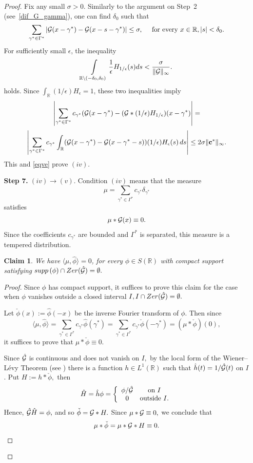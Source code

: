 \documentclass[12pt]{amsart}
\numberwithin{equation}{section}
\newtheorem{claim}[theorem]{Claim}
\newcommand{\R}{{\mathbb R}} \newcommand{\Q}{{\mathbb Q}} \newcommand{\Z}{{\mathbb Z}} \newcommand{\N}{{\mathbb N}}
\newcommand{\Zer}{{\rm Zer}}
\newcommand{\supp}{{\rm supp\,}}
\begin{document}
\begin{proof}
 
    Fix any small $\sigma > 0.$
    Similarly to the argument on Step~2 (see~\eqref{dif_G_gamma}), one can find $\delta_0$ such that 
  $$  \sum_{\gamma^\ast\in \Gamma^\ast}|\Ff(x-\gamma^\ast) - \Ff(x-s-\gamma^{\ast})| \le \sigma, \quad  \text{   for every } x\in \R, |s| < \delta_0. 
  $$
    For sufficiently small $\epsilon$, the inequality
    $$\int\limits_{\R\setminus(-\delta_0,\delta_0)} \frac{1}{\epsilon}  H_{1/\epsilon}(s) ds < \frac{\sigma}{\|\Ff\|_\infty}.
    $$
    holds. Since $\int_\R (1/\epsilon)H_\epsilon=1$, these two inequalities imply
        $$\left|\sum_{\gamma^\ast\in \Gamma^\ast}c_{\gamma^\ast}(\mathcal{G}(x-\gamma^\ast) - (\mathcal{G}\ast (1/\epsilon) H_{1/\epsilon})(x-\gamma^\ast)\right|=$$    
     $$\left|\sum_{\gamma^\ast\in \Gamma^\ast}c_{\gamma^\ast}\int_\R(\Ff(x-\gamma^\ast) - \Ff(x-\gamma^\ast-s)) (1/\epsilon)H_\epsilon(s)\,ds\right| \le2\sigma\|{\bf c^\ast}\|_\infty.$$This and \eqref{eqve} prove $(iv)$. 



{ \bf   \noindent Step 7.} $(iv)\rightarrow (v)$. Condition $(iv)$ means that the measure $$\mu=\sum_{\gamma^\ast\in\Gamma^\ast}c_{\gamma^\ast}\delta_{\gamma^\ast}$$satisfies
    $$\mu\ast \mathcal{G}(x)\equiv 0.$$
    Since the coefficients $c_{\gamma^{\ast}}$ are bounded and 
   $\Gamma^{\ast}$ is separated, this measure is a tempered distribution. 

    \begin{claim}\label{c1}
        We have $\langle\mu,\hat\phi\rangle=0$, for every $\phi\in S(\R)$ with compact support satisfying $\supp(\phi)\cap \Zer(\hat\Ff)=\emptyset.$
    \end{claim}


\begin{proof}
    Since $\phi$ has compact support, it suffices to prove this claim for the case when
    $\phi$ vanishes outside a closed interval $I, I\cap \Zer(\hat\Ff)=\emptyset.$

    Let $\check\phi(x):=\hat\phi(-x)$ be  the inverse Fourier transform of $\phi$. 
    Then since$$\langle \mu,\hat\phi \rangle =\sum_{\gamma^\ast\in\Gamma^\ast}c_{\gamma^\ast}\hat\phi(\gamma^\ast)=\sum_{\gamma^\ast\in\Gamma^\ast}c_{\gamma^\ast} \check\phi(-\gamma^\ast)=(\mu\ast \check\phi)(0),$$it suffices to prove that $\mu\ast\check\phi\equiv0.$


    Since $\hat{\mathcal{G}}$ is continuous and does not vanish on $I,$ by the local form of the Wiener–L\'{e}vy Theorem  (see   \cite[Chapter~6]{MR1802924}) there is a function $h\in L^1(\R)$ such that  $\hat h(t)=1/\hat{\mathcal{G}}(t)$ on $I$.  
    Put $H:=h\ast\check\phi,$ then 
    $$
    \hat H=\hat h \phi=\left\{\begin{array}{cc}
     \phi/\hat{\mathcal{G}}    & \mbox{on } I \\
      0  &  \mbox{outside }  I. 
    \end{array}\right.
    $$
    Hence, $\hat{\mathcal{G}}\hat H=\phi,$ and so $\check\phi= \mathcal{G}\ast H.$ Since $\mu\ast\mathcal{G}\equiv 0,$ we conclude that $$\mu\ast \check\phi=\mu\ast \mathcal{G}\ast H\equiv0.$$
\end{proof}


\end{proof}
\end{document}

